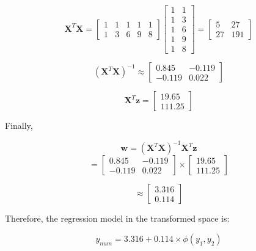 \documentclass{article}
\begin{document}
\begin{enumerate}[leftmargin=\labelsep]
\[
\mathbf{X}^T \mathbf{X} = 
\begin{bmatrix}
1 & 1 & 1 & 1 & 1 \\
1 & 3 & 6 & 9 & 8
\end{bmatrix}
\begin{bmatrix}
1 & 1 \\
1 & 3 \\
1 & 6 \\
1 & 9 \\
1 & 8
\end{bmatrix}
=
\begin{bmatrix}
5 & 27 \\
27 & 191
\end{bmatrix}
\]

\[(\mathbf{X}^T \mathbf{X})^{-1} \approx \begin{bmatrix}
0.845 & -0.119 \\
-0.119 & 0.022
\end{bmatrix}\]

\[\mathbf{X}^T \mathbf{z} = \begin{bmatrix}
19.65 \\
111.25
\end{bmatrix}\]

Finally,

\[\boldsymbol{w} = (\mathbf{X}^T \mathbf{X})^{-1} \mathbf{X}^T \mathbf{z}\]
\[= \begin{bmatrix}
0.845 & -0.119 \\
-0.119 & 0.022
\end{bmatrix} \times \begin{bmatrix}
19.65 \\
111.25
\end{bmatrix}\]

\[\approx \begin{bmatrix}
3.316\\
0.114
\end{bmatrix}\]

Therefore, the regression model in the transformed space is:

\[y_{num} = 3.316 + 0.114 \times \phi(y_1, y_2)\]


\end{enumerate}
\end{document}
